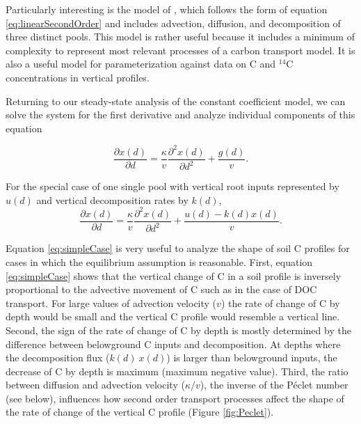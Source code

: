 \documentclass[11pt, oneside, a4paper]{article}   	%
\begin{document}
Particularly interesting is the model of \citet{Elzein1995}, which follows the form of equation \ref{eq:linearSecondOrder} and includes advection, diffusion, and decomposition of three distinct pools. This model is rather useful because it includes a minimum of complexity to represent most relevant processes of a carbon transport model. It is also a useful model for parameterization against data on C and $^{14}$C concentrations in vertical profiles. 

Returning to our steady-state analysis of the constant coefficient model, we can solve the system for the first derivative and analyze individual components of this equation

\begin{equation} \label{eq:firstDeriv}
\frac{\partial x(d)}{\partial d} = \frac{\kappa}{v} \frac{\partial^2 x(d)}{\partial d^2} + \frac{g(d)}{v}.
\end{equation}

For the special case of one single pool with vertical root inputs represented by $u(d)$ and vertical decomposition rates by $k(d)$,
\begin{equation} \label{eq:simpleCase}
\frac{\partial x(d)}{\partial d} = \frac{\kappa}{v} \frac{\partial^2 x(d)}{\partial d^2} + \frac{u(d) - k(d) x(d)}{v}.
\end{equation}

Equation \ref{eq:simpleCase} is very useful to analyze the shape of soil C profiles for cases in which the equilibrium assumption is reasonable. 
First, equation \ref{eq:simpleCase} shows that the vertical change of C in a soil profile is inversely proportional to the advective movement of C such as in the case of DOC transport. For large values of advection velocity ($v$) the rate of change of C by depth would be small and the vertical C profile would resemble a vertical line. Second, the sign of the rate of change of C by depth is mostly determined by the difference between belowground C inputs and decomposition. At depths where the decomposition flux ($k(d) \ x(d)$) is larger than belowground inputs, the decrease of C by depth is maximum (maximum negative value). Third, the ratio between diffusion and advection velocity ($\kappa / v$), the inverse of the Péclet number (see below), influences how second order transport processes affect the shape of the rate of change of the vertical C profile (Figure \ref{fig:Peclet}). 
\end{document}
